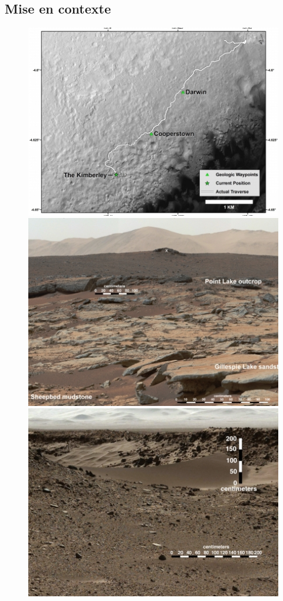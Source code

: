 \subsection{Mise en contexte}
    \begin{frame}
        \begin{center}
        \begin{figure}
            \includegraphics[height=0.4\textheight]{./media/landing.jpg}
            \includegraphics[height=0.4\textheight]{./media/geometry2.jpg}\\
            \includegraphics[height=0.4\textheight]{./media/geometry.jpg}

\end{figure}
\end{center}
\end{frame}
